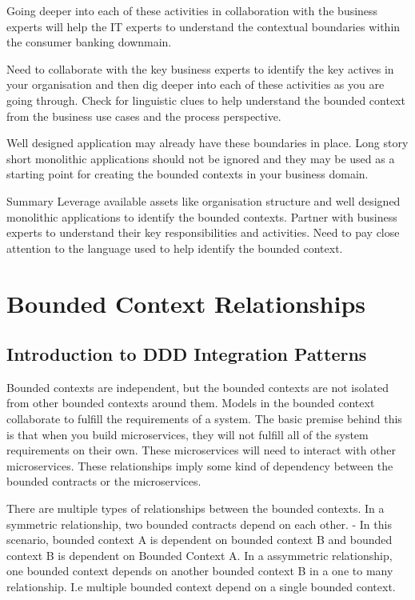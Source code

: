 Going deeper into each of these activities in collaboration with the business experts will help the IT experts to understand the contextual boundaries within the consumer banking downmain.

Need to collaborate with the key business experts to identify the key actives in your organisation and then dig deeper into each of these activities as you are going through.
Check for linguistic clues to help understand the bounded context from the business use cases and the process perspective.

Well designed application may already have these boundaries in place.
Long story short monolithic applications should not be ignored and they may be used as a starting point for creating the bounded contexts in your business domain.

Summary
Leverage available assets like organisation structure and well designed monolithic applications to identify the bounded contexts.
Partner with business experts to understand their key responsibilities and activities.
Need to pay close attention to the language used to help identify the bounded context.


\chapter{Bounded Context Relationships}


\section{Introduction to DDD Integration Patterns}
Bounded contexts are independent, but the bounded contexts are not isolated from other bounded contexts around them.
Models in the bounded context collaborate to fulfill the requirements of a system.
The basic premise behind this is that when you build microservices, they will not fulfill all of the system requirements on their own.
These microservices will need to interact with other microservices.
These relationships imply some kind of dependency between the bounded contracts or the microservices.

There are multiple types of relationships between the bounded contexts.
In a symmetric relationship, two bounded contracts depend on each other.
- In this scenario, bounded context A is dependent on bounded context B and bounded context B is dependent on Bounded Context A.
In a assymmetric relationship, one bounded context depends on another bounded context B in a one to many relationship. I.e multiple bounded context depend on a single bounded context.

